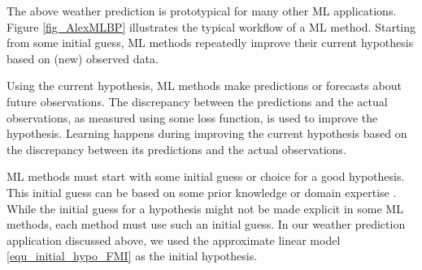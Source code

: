 \documentclass[12pt]{report}
\begin{document}

The above weather prediction is prototypical for many other 
ML applications. Figure \ref{fig_AlexMLBP} illustrates the typical 
workflow of a ML method. Starting from some initial guess, ML 
methods repeatedly improve their current hypothesis based on 
(new) observed data. 

Using the current hypothesis, ML methods make predictions or 
forecasts about future observations. The discrepancy between 
the predictions and the actual observations, as measured using 
some loss function, is used to improve 
the hypothesis. Learning happens during improving the current 
hypothesis based on the discrepancy between its predictions 
and the actual observations. 

ML methods must start with some initial guess or choice for a 
good hypothesis. This initial guess can be based on some prior 
knowledge or domain expertise \cite{MitchellBias1980}. While 
the initial guess for a hypothesis might not be made explicit in 
some ML methods, each method must use such an initial guess. 
In our weather prediction application discussed above, we 
used the approximate linear model \eqref{equ_initial_hypo_FMI} 
as the initial hypothesis. 
 



\end{document}

